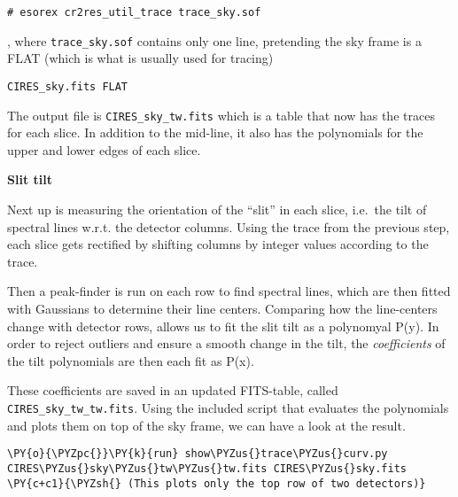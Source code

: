 \begin{verbatim}
# esorex cr2res_util_trace trace_sky.sof
\end{verbatim}

, where \texttt{trace\_sky.sof} contains only one line, pretending the
sky frame is a FLAT (which is what is usually used for tracing)

\begin{verbatim}
CIRES_sky.fits FLAT
\end{verbatim}

The output file is \texttt{CIRES\_sky\_tw.fits} which is a table that
now has the traces for each slice. In addition to the mid-line, it also
has the polynomials for the upper and lower edges of each slice.

    \textbf{Slit tilt}

Next up is measuring the orientation of the ``slit'' in each slice,
i.e.~the tilt of spectral lines w.r.t. the detector columns. Using the
trace from the previous step, each slice gets rectified by shifting
columns by integer values according to the trace.

Then a peak-finder is run on each row to find spectral lines, which are
then fitted with Gaussians to determine their line centers. Comparing
how the line-centers change with detector rows, allows us to fit the
slit tilt as a polynomyal P(y). In order to reject outliers and ensure a
smooth change in the tilt, the \emph{coefficients} of the tilt
polynomials are then each fit as P(x).

These coefficients are saved in an updated FITS-table, called
\texttt{CIRES\_sky\_tw\_tw.fits}. Using the included script that
evaluates the polynomials and plots them on top of the sky frame, we can
have a look at the result.

    \begin{tcolorbox}[breakable, size=fbox, boxrule=1pt, pad at break*=1mm,colback=cellbackground, colframe=cellborder]
\begin{Verbatim}[commandchars=\\\{\}]
\PY{o}{\PYZpc{}}\PY{k}{run} show\PYZus{}trace\PYZus{}curv.py CIRES\PYZus{}sky\PYZus{}tw\PYZus{}tw.fits CIRES\PYZus{}sky.fits
\PY{c+c1}{\PYZsh{} (This plots only the top row of two detectors)}
\end{Verbatim}
\end{tcolorbox}

    \begin{center}
    \end{center}
    { \hspace*{\fill} \\}
    
